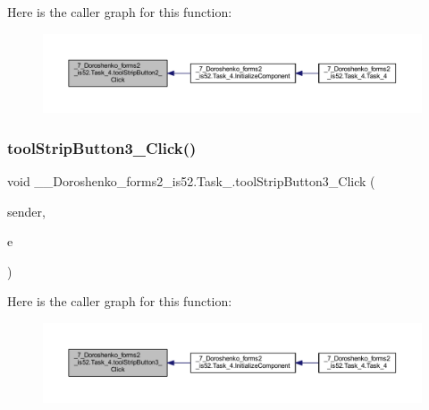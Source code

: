 Here is the caller graph for this function\+:
\nopagebreak
\begin{figure}[H]
\begin{center}
\leavevmode
\includegraphics[width=350pt]{class__7___doroshenko__forms2__is52_1_1_task__4_af5d8fcef07a2c9695104b7036a2e423a_icgraph}
\end{center}
\end{figure}
\hypertarget{class__7___doroshenko__forms2__is52_1_1_task__4_a69d7be2aaa5831685d50c46aaee3aef3}{}\label{class__7___doroshenko__forms2__is52_1_1_task__4_a69d7be2aaa5831685d50c46aaee3aef3} 
\subsubsection{\texorpdfstring{tool\+Strip\+Button3\+\_\+\+Click()}{toolStripButton3\_Click()}}
{\footnotesize\ttfamily void \+\_\+\_\+\+Doroshenko\+\_\+forms2\+\_\+is52.\+Task\+\_.\+tool\+Strip\+Button3\+\_\+\+Click (\begin{DoxyParamCaption}\item[{object}]{sender,  }\item[{Event\+Args}]{e }\end{DoxyParamCaption})\hspace{0.3cm}{\ttfamily [private]}}

Here is the caller graph for this function\+:
\nopagebreak
\begin{figure}[H]
\begin{center}
\leavevmode
\includegraphics[width=350pt]{class__7___doroshenko__forms2__is52_1_1_task__4_a69d7be2aaa5831685d50c46aaee3aef3_icgraph}
\end{center}
\end{figure}


